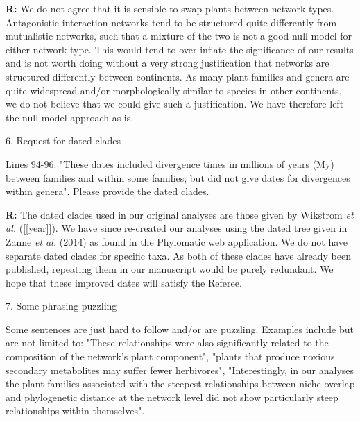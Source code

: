\documentclass[12pt]{letter}
\newenvironment{refquote}{\bigskip \begin{it}}{\end{it}\smallskip}
\begin{document}
      \textbf{R:} We do not agree that it is sensible to swap plants between network types. Antagonistic interaction networks tend to be structured quite differently from mutualistic networks, such that a mixture of the two is not a good null model for either network type. This would tend to over-inflate the significance of our results and is not worth doing without a very strong justification that networks are structured differently between continents. As many plant families and genera are quite widespread and/or morphologically similar to species in other continents, we do not believe that we could give such a justification. We have therefore left the null model approach as-is.


  6. Request for dated clades

    \begin{refquote}

      Lines 94-96. "These dates included divergence times in millions of years (My) between families and within some families, but did not give dates for divergences within genera". Please provide the dated clades.

      \end{refquote}

      \textbf{R:} The dated clades used in our original analyses are those given by Wikstrom \emph{et al.} ([[year]]). We have since re-created our analyses using the dated tree given in Zanne \emph{et al.} (2014) as found in the Phylomatic web application. We do not have separate dated clades for specific taxa. As both of these clades have already been published, repeating them in our manuscript would be purely redundant. We hope that these improved dates will satisfy the Referee.


  7. Some phrasing puzzling 

    \begin{refquote}

      Some sentences are just hard to follow and/or are puzzling. Examples include but are not limited to: "These relationships were also significantly related to the composition of the network’s plant component", "plants that produce noxious secondary metabolites may suffer fewer herbivores", "Interestingly, in our analyses the plant families associated with the steepest relationships between niche overlap and phylogenetic distance at the network level did not show particularly steep relationships within themselves".

    \end{refquote}
\end{document}
